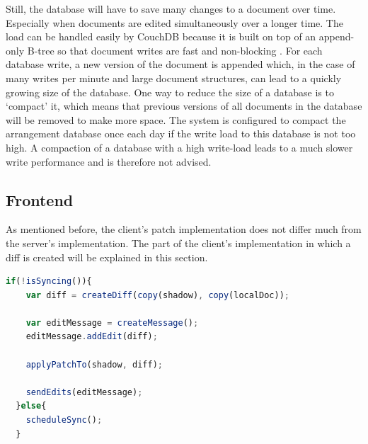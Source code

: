 Still, the database will have to save many changes to a document over time. Especially when documents are edited simultaneously over a longer time. The load can be handled easily by CouchDB because it is built on top of an append-only B-tree so that document writes are fast and non-blocking \cite[chapter: The Power of B-trees]{anderson2010couchdb}. For each database write, a new version of the document is appended which, in the case of many writes per minute and large document structures, can lead to a quickly growing size of the database. One way to reduce the size of a database is to `compact' it, which means that previous versions of all documents in the database will be removed to make more space. The system is configured to compact the arrangement database once each day if the write load to this database is not too high. A compaction of a database with a high write-load leads to a much slower write performance and is therefore not advised.

\subsection{Frontend}

As mentioned before, the client's patch implementation does not differ much from the server's implementation. The part of the client's implementation in which a diff is created will be explained in this section.

\begin{lstlisting}[language=JavaScript, caption=DS implementation (Frontend), label=lst:ds-frontend]
  if(!isSyncing()){
    var diff = createDiff(copy(shadow), copy(localDoc));

    var editMessage = createMessage();
    editMessage.addEdit(diff);

    applyPatchTo(shadow, diff);

    sendEdits(editMessage);
  }else{
    scheduleSync();
  }
\end{lstlisting}

